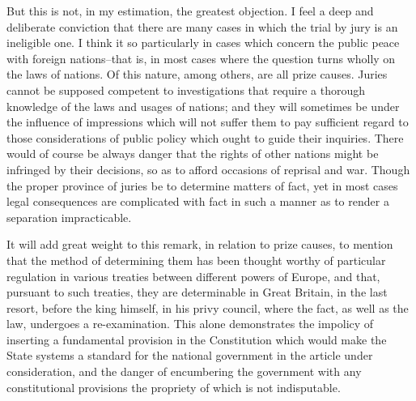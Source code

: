 But this is not, in my estimation, the greatest objection. 
I feel a deep and deliberate conviction that there are many cases in which the trial by jury is an ineligible one. 
I think it so particularly in cases which concern the public peace with foreign nations--that is, in most cases where the question turns wholly on the laws of nations. 
Of this nature, among others, are all prize causes. 
Juries cannot be supposed competent to investigations that require a thorough knowledge of the laws and usages of nations; and they will sometimes be under the influence of impressions which will not suffer them to pay sufficient regard to those considerations of public policy which ought to guide their inquiries. 
There would of course be always danger that the rights of other nations might be infringed by their decisions, so as to afford occasions of reprisal and war. 
Though the proper province of juries be to determine matters of fact, yet in most cases legal consequences are complicated with fact in such a manner as to render a separation impracticable.

It will add great weight to this remark, in relation to prize causes, to mention that the method of determining them has been thought worthy of particular regulation in various treaties between different powers of Europe, and that, pursuant to such treaties, they are determinable in Great Britain, in the last resort, before the king himself, in his privy council, where the fact, as well as the law, undergoes a re-examination. 
This alone demonstrates the impolicy of inserting a fundamental provision in the Constitution which would make the State systems a standard for the national government in the article under consideration, and the danger of encumbering the government with any constitutional provisions the propriety of which is not indisputable.

